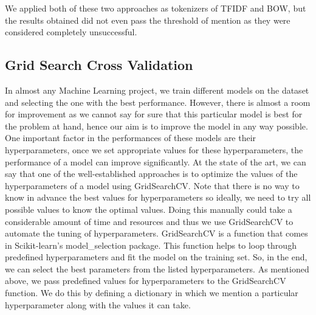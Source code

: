 We applied both of these two approaches as tokenizers of TFIDF and BOW, but the results obtained did not even pass the threshold of mention as they were considered completely unsuccessful.

\subsection{Grid Search Cross Validation}
In almost any Machine Learning project, we train different models on the dataset and selecting the one with the best performance. However, there is almost a room for improvement as we cannot say for sure that this particular model is best for the problem at hand, hence our aim is to improve the model in any way possible. One important factor in the performances of these models are their hyperparameters, once we set appropriate values for these hyperparameters, the performance of a model can improve significantly. At the state of the art, we can say that one of the well-established approaches is to optimize the values of the hyperparameters of a model using GridSearchCV.
Note that there is no way to know in advance the best values for hyperparameters so ideally, we need to try all possible values to know the optimal values. Doing this manually could take a considerable amount of time and resources and thus we use GridSearchCV to automate the tuning of hyperparameters.
GridSearchCV is a function that comes in Scikit-learn’s model\_selection package. This function helps to loop through predefined hyperparameters and fit the model on the training set. So, in the end, we can select the best parameters from the listed hyperparameters.
As mentioned above, we pass predefined values for hyperparameters to the GridSearchCV function. We do this by defining a dictionary in which we mention a particular hyperparameter along with the values it can take.

